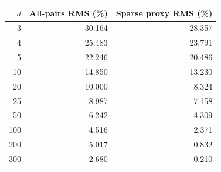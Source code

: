 \begin{tabular}{rrr}\toprule
$d$ & All-pairs RMS (\%) & Sparse proxy RMS (\%) \\ \midrule
3 & 30.164 & 28.357 \\
4 & 25.483 & 23.791 \\
5 & 22.246 & 20.486 \\
10 & 14.850 & 13.230 \\
20 & 10.000 & 8.324 \\
25 & 8.987 & 7.158 \\
50 & 6.242 & 4.309 \\
100 & 4.516 & 2.371 \\
200 & 5.017 & 0.832 \\
300 & 2.680 & 0.210 \\
\bottomrule\end{tabular}
